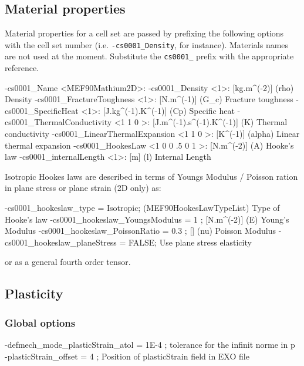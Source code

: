 \documentclass[10pt,oneside]{memoir}
\begin{document}
\subsection{Material properties}
\label{sec:MatProp}
Material properties for a cell set are passed by prefixing the following options with the cell set number (i.e. \verb+-cs0001_Density+, for instance). Materials names are not used at the moment. Substitute the \verb+cs0001_+ prefix with the appropriate reference.
\small{
\begin{boxedverbatim}
-cs0001_Name <MEF90Mathium2D>:  
-cs0001_Density <1>: [kg.m^(-2)] (rho) Density 
-cs0001_FractureToughness <1>: [N.m^(-1)] (G_c) Fracture toughness 
-cs0001_SpecificHeat <1>: [J.kg^(-1).K^(-1)] (Cp) Specific heat 
-cs0001_ThermalConductivity <1 1 0 >: [J.m^(-1).s^(-1).K^(-1)] (K) Thermal conductivity 
-cs0001_LinearThermalExpansion <1 1 0 >: [K^(-1)] (alpha) Linear thermal expansion  
-cs0001_HookesLaw <1 0 0 .5 0 1 >: [N.m^(-2)] (A) Hooke's law 
-cs0001_internalLength <1>: [m] (l) Internal Length 
\end{boxedverbatim}
}

Isotropic Hookes laws are described in terms of  Youngs Modulus / Poisson ration in plane stress or plane strain (2D only) as:
\begin{boxedverbatim}
-cs0001_hookeslaw_type = Isotropic; (MEF90HookesLawTypeList) Type of Hooke's law
-cs0001_hookeslaw_YoungsModulus = 1 ; [N.m^(-2)] (E) Young's Modulus
-cs0001_hookeslaw_PoissonRatio = 0.3 ; [] (nu) Poisson Modulus
-cs0001_hookeslaw_planeStress =  FALSE; Use plane stress elasticity
\end{boxedverbatim}
or as a general fourth order tensor.


\subsection{Plasticity}


\subsubsection{Global options}
\small{\begin{boxedverbatim}
-defmech_mode_plasticStrain_atol = 1E-4 ; tolerance for the infinit norme in p
-plasticStrain_offset = 4 ; Position of plasticStrain field in EXO file 
\end{boxedverbatim}}
\end{document}
